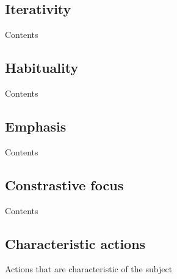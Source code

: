 \subsection{Iterativity} 

Contents

\subsection{Habituality} 

Contents

\subsection{Emphasis} 

Contents

\subsection{Constrastive focus} 

Contents

\subsection{Characteristic actions} 

Actions that are characteristic of the subject

